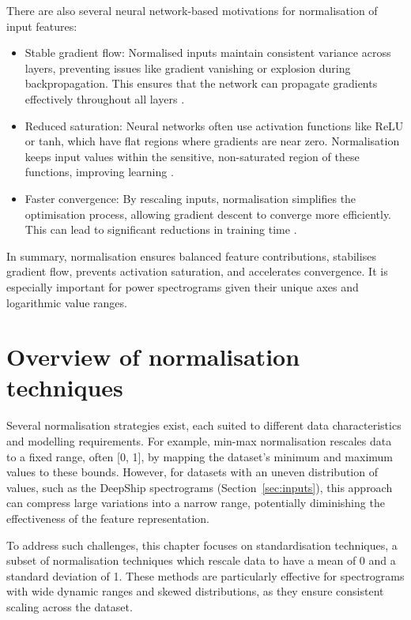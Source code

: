 There are also several neural network-based motivations for normalisation of input features:
\begin{itemize}
    \item Stable gradient flow: Normalised inputs maintain consistent variance across layers, preventing issues like gradient vanishing or explosion during backpropagation. This ensures that the network can propagate gradients effectively throughout all layers \cite{glorot_understanding_2010, wu_group_2018, pons_deep_2019}.
    \item Reduced saturation: Neural networks often use activation functions like ReLU or tanh, which have flat regions where gradients are near zero. Normalisation keeps input values within the sensitive, non-saturated region of these functions, improving learning \cite{glorot_understanding_2010}.
    \item Faster convergence: By rescaling inputs, normalisation simplifies the optimisation process, allowing gradient descent to converge more efficiently. This can lead to significant reductions in training time \cite{montavon_efficient_2012}.
\end{itemize}

In summary, normalisation ensures balanced feature contributions, stabilises gradient flow, prevents activation saturation, and accelerates convergence. It is especially important for power spectrograms given their unique axes and logarithmic value ranges.

\section{Overview of normalisation techniques}

Several normalisation strategies exist, each suited to different data characteristics and modelling requirements. For example, min-max normalisation rescales data to a fixed range, often [0, 1], by mapping the dataset's minimum and maximum values to these bounds. However, for datasets with an uneven distribution of values, such as the DeepShip spectrograms (Section~\ref{sec:inputs}), this approach can compress large variations into a narrow range, potentially diminishing the effectiveness of the feature representation.

To address such challenges, this chapter focuses on standardisation techniques, a subset of normalisation techniques which rescale data to have a mean of 0 and a standard deviation of 1. These methods are particularly effective for spectrograms with wide dynamic ranges and skewed distributions, as they ensure consistent scaling across the dataset.


